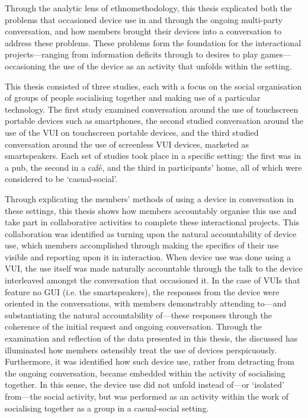 \begin{revisedsubmission}
Through the analytic lens of ethnomethodology, this thesis explicated both the problems that occasioned device use in and through the ongoing multi-party conversation, and how members brought their devices into a conversation to address these problems.
These problems form the foundation for the interactional projects---ranging from information deficits through to desires to play games---occasioning the use of the device as an activity that unfolds within the setting.

This thesis consisted of three studies, each with a focus on the social organisation of groups of people socialising together and making use of a particular technology.
The first study examined conversation around the use of touchscreen portable devices such as smartphones, the second studied conversation around the use of the \acf{VUI} on touchscreen portable devices, and the third studied conversation around the use of screenless \ac{VUI} devices, marketed as smartspeakers.
Each set of studies took place in a specific setting: the first was in a pub, the second in a caf\'{e}, and the third in participants' home, all of which were considered to be `casual-social'.

Through explicating the members' methods of using a device in conversation in these settings, this thesis shows how members accountably organise this use and take part in collaborative activities to complete these interactional projects.
This collaboration was identified as turning upon the natural accountability of device use, which members accomplished through making the specifics of their use visible and reporting upon it in interaction.
When device use was done using a \ac{VUI}, the use itself was made naturally accountable through the talk to the device interleaved amongst the conversation that occasioned it.
In the case of \acp{VUI} that feature no \acf{GUI} (i.e. the smartspeakers), the responses from the device were oriented in the conversations, with members demonstrably attending to---and substantiating the natural accountability of---these responses through the coherence of the initial request and ongoing conversation.
Through the examination and reflection of the data presented in this thesis, the discussed has illuminated how members ostensibly treat the use of devices perspicuously.
Furthermore, it was identified how such device use, rather from detracting from the ongoing conversation, became embedded within the activity of socialising together.
In this sense, the device use did not unfold instead of---or `isolated' from---the social activity, but was performed as an activity within the work of socialising together as a group in a casual-social setting.


\end{revisedsubmission}
